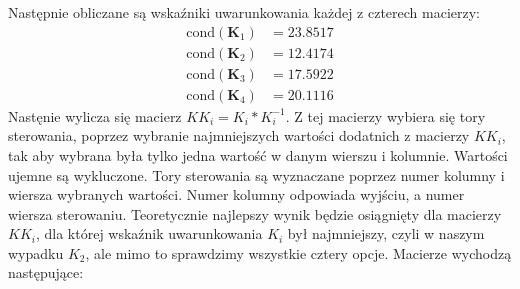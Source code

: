 Następnie obliczane są wskaźniki uwarunkowania każdej z czterech macierzy:
\begin{align}
  \text{cond}(\bm{K}_1) &= \num{23,8517} \\
  \text{cond}(\bm{K}_2) &=  \num{12,4174} \\
  \text{cond}(\bm{K}_3) &= \num{17,5922} \\
  \text{cond}(\bm{K}_4) &= \num{20,1116}
\end{align}
Nastęnie wylicza się macierz $KK_i = K_i * K_i^{-1}$. Z tej macierzy
wybiera się tory sterowania, poprzez wybranie najmniejszych wartości dodatnich
z macierzy $KK_i$, tak aby wybrana była tylko jedna wartość w danym wierszu i kolumnie.
Wartości ujemne są wykluczone. Tory sterowania są wyznaczane poprzez numer kolumny
i wiersza wybranych wartości. Numer kolumny odpowiada wyjściu, a numer wiersza sterowaniu.
Teoretycznie najlepszy wynik będzie osiągnięty dla
macierzy $KK_i$, dla której wskaźnik uwarunkowania $K_i$ był najmniejszy, czyli
w naszym wypadku $K_2$, ale mimo to sprawdzimy wszystkie cztery opcje. Macierze
wychodzą następujące:



